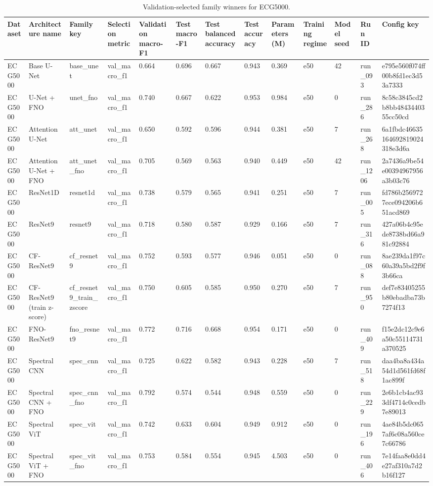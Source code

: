 \begin{table}
\caption{Validation-selected family winners for ECG5000.}
\label{tab:ecg5000_best_model_performance}
\begin{tabular}{lllllllllllll}
\toprule
Dataset & Architecture name & Family key & Selection metric & Validation macro-F1 & Test macro-F1 & Test balanced accuracy & Test accuracy & Parameters (M) & Training regime & Model seed & Run ID & Config key \\
\midrule
ECG5000 & Base U-Net & base\_unet & val\_macro\_f1 & 0.664 & 0.696 & 0.667 & 0.943 & 0.369 & e50 & 42 & run\_093 & e795e560f074ff00b8fd1ec3d53a7333 \\
ECG5000 & U-Net + FNO & unet\_fno & val\_macro\_f1 & 0.740 & 0.667 & 0.622 & 0.953 & 0.984 & e50 & 0 & run\_286 & 8c58c3845cd2b8bb4843440355cc50cd \\
ECG5000 & Attention U-Net & att\_unet & val\_macro\_f1 & 0.650 & 0.592 & 0.596 & 0.944 & 0.381 & e50 & 7 & run\_268 & 6a1fbdc46635164692819024318e3d6a \\
ECG5000 & Attention U-Net + FNO & att\_unet\_fno & val\_macro\_f1 & 0.705 & 0.569 & 0.563 & 0.940 & 0.449 & e50 & 42 & run\_1206 & 2a7436a9be54e00394967956a3b03c76 \\
ECG5000 & ResNet1D & resnet1d & val\_macro\_f1 & 0.738 & 0.579 & 0.565 & 0.941 & 0.251 & e50 & 7 & run\_005 & fd786b2569727ece094206b651acd869 \\
ECG5000 & ResNet9 & resnet9 & val\_macro\_f1 & 0.718 & 0.580 & 0.587 & 0.929 & 0.166 & e50 & 7 & run\_316 & 427a06b4c95ede8738bd66a981c92884 \\
ECG5000 & CF-ResNet9 & cf\_resnet9 & val\_macro\_f1 & 0.752 & 0.593 & 0.577 & 0.946 & 0.051 & e50 & 0 & run\_088 & 8ae239da1f97c60a39a5bd2f9f3b66ca \\
ECG5000 & CF-ResNet9 (train z-score) & cf\_resnet9\_train\_zscore & val\_macro\_f1 & 0.750 & 0.605 & 0.585 & 0.950 & 0.270 & e50 & 7 & run\_950 & def7e83405255b80ebadba73b7274f13 \\
ECG5000 & FNO-ResNet9 & fno\_resnet9 & val\_macro\_f1 & 0.772 & 0.716 & 0.668 & 0.954 & 0.171 & e50 & 0 & run\_409 & f15e2dc12c9e6a50c55114731a370525 \\
ECG5000 & Spectral CNN & spec\_cnn & val\_macro\_f1 & 0.725 & 0.622 & 0.582 & 0.943 & 0.228 & e50 & 7 & run\_518 & daa4ba8a434a54d1d561fd68f1ac899f \\
ECG5000 & Spectral CNN + FNO & spec\_cnn\_fno & val\_macro\_f1 & 0.792 & 0.574 & 0.544 & 0.948 & 0.559 & e50 & 0 & run\_229 & 2e6b1cb4ac933df4714c0cedb7e89013 \\
ECG5000 & Spectral ViT & spec\_vit & val\_macro\_f1 & 0.742 & 0.633 & 0.604 & 0.949 & 0.912 & e50 & 0 & run\_196 & 4ae84b5dc0657af6c08a560ce7c66786 \\
ECG5000 & Spectral ViT + FNO & spec\_vit\_fno & val\_macro\_f1 & 0.753 & 0.584 & 0.554 & 0.945 & 4.503 & e50 & 0 & run\_406 & 7e14faa8e0dd4e27af310a7d2b16f127 \\
\bottomrule
\end{tabular}
\end{table}
